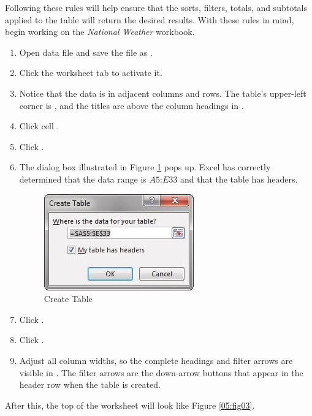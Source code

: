 Following these rules will help ensure that the sorts, filters, totals, and subtotals applied to the table will return the desired results. With these rules in mind, begin working on the \textit{National Weather} workbook. 

\begin{enumbox}
	\begin{enumerate}
		\item Open data file  and save the file as .
		\item Click the  worksheet tab to activate it.
		\item Notice that the data is in adjacent columns and rows. The table's upper-left corner is , and the titles are above the column headings in .
		\item Click cell .
		\item Click .
		\item The dialog box illustrated in Figure \ref{05:fig02} pops up. Excel has correctly determined that the data range is $ A5 $:$ E33 $ and that the table has headers.

		\begin{figure}[H]
			\centering
			\includegraphics[width=\maxwidth{.95\linewidth}]{gfx/ch05_fig02}
			\caption{Create Table}
			\label{05:fig02}
		\end{figure}

		\item Click .
		\item Click .
		\item Adjust all column widths, so the complete headings and filter arrows are visible in . The filter arrows are the down-arrow buttons that appear in the header row when the table is created. 
	\end{enumerate}
\end{enumbox}
	
After this, the top of the worksheet will look like Figure \ref{05:fig03}.

